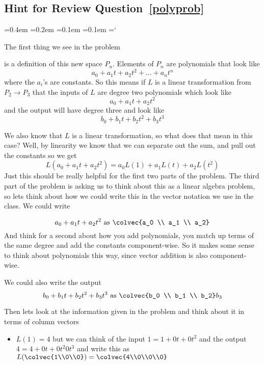 
\subsection*{Hint for Review Question~\ref{polyprob}}

{\ttfamily
{}\font=0.4em
\font=0.2em
\font=0.1em
\font=0.1em
\hyphenchar\font=`\-

\hypertarget{scripts_linear_transformations_hint}{The first thing we see in the problem} is a definition of this new space $P_n$. Elements of $P_n$ are polynomials that look like \[a_0 + a_1 t +a_2 t^2 + \ldots + a_n t^n\] where the $a_i$'s are constants. So this means if $L$ is a linear transformation from $P_2 \to P_3$ that the inputs of $L$ are degree two polynomials which look like \[a_0 + a_1 t +a_2 t^2\]
and the output will have degree three and look like \[b_0 + b_1 t +b_2 t^2 + b_3 t^3\]

We also know that $L$ is a linear transformation, so what does that mean in this case? Well, by linearity we know that we can separate out the sum, and pull out the constants so we get
\[ L (a_0 + a_1 t +a_2 t^2) = a_0L(1) + a_1L( t) +a_2 L( t^2)\]
Just this should be really helpful for the first two parts of the problem. The third part of the problem is asking us to think about this as a linear algebra problem, so lets think about how we could write this in the vector notation we use in the class. We could write 

\[a_0 + a_1 t +a_2 t^2 \text{ as } \colvec{a_0 \\ a_1 \\ a_2} \]
And think for a second about how you add polynomials, you match up terms of the same degree and add the constants component-wise. So it makes some sense to think about polynomials this way, since vector addition is also component-wise.

We could also write the output 
\[  b_0 + b_1 t +b_2 t^2 + b_3 t^3 \text{ as }  \colvec{b_0 \\ b_1 \\ b_2} \\ b_3\]

Then lets look at the information given in the problem and think about it in terms of column vectors 
\begin{itemize}
\item $L(1) = 4$ but we can think of the input $1= 1+ 0t + 0t^2 $ and the output  $4 = 4+ 0t + 0t^2 0t^3$ and write this as $ L (\colvec{1\\0\\0}) = \colvec{4\\0\\0\\0}$


\end{itemize}}
